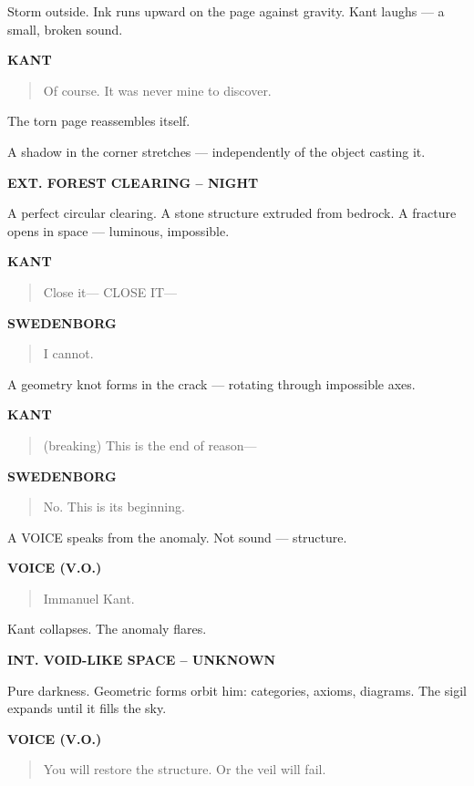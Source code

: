 \documentclass[12pt]{article}
\newcommand{\Scene}[1]{\vspace{1.2em}\textbf{#1}\vspace{0.8em}}
\newcommand{\Character}[1]{\vspace{0.8em}\textbf{#1}\vspace{0.4em}}
\newenvironment{Dialogue}{\begin{quote}\begin{RaggedRight}}{\end{RaggedRight}\end{quote}}
\newcommand{\Action}[1]{\vspace{0.4em}#1\vspace{0.4em}}
\begin{document}
\Action{Storm outside.  
Ink runs upward on the page against gravity.  
Kant laughs — a small, broken sound.}

\Character{KANT}
\begin{Dialogue}
Of course.  
It was never mine to discover.
\end{Dialogue}

\Action{The torn page reassembles itself.}

\Action{A shadow in the corner stretches — independently of the object casting it.}

\Scene{EXT. FOREST CLEARING – NIGHT}

\Action{A perfect circular clearing.  
A stone structure extruded from bedrock.  
A fracture opens in space — luminous, impossible.}

\Character{KANT}
\begin{Dialogue}
Close it— CLOSE IT—
\end{Dialogue}

\Character{SWEDENBORG}
\begin{Dialogue}
I cannot.
\end{Dialogue}

\Action{A geometry knot forms in the crack — rotating through impossible axes.}

\Character{KANT}
\begin{Dialogue}
(breaking)  
This is the end of reason—
\end{Dialogue}

\Character{SWEDENBORG}
\begin{Dialogue}
No.  
This is its beginning.
\end{Dialogue}

\Action{A VOICE speaks from the anomaly.  
Not sound — structure.}

\Character{VOICE (V.O.)}
\begin{Dialogue}
Immanuel Kant.
\end{Dialogue}

\Action{Kant collapses. The anomaly flares.}

\Scene{INT. VOID-LIKE SPACE – UNKNOWN}

\Action{Pure darkness.  
Geometric forms orbit him: categories, axioms, diagrams.  
The sigil expands until it fills the sky.}

\Character{VOICE (V.O.)}
\begin{Dialogue}
You will restore the structure.  
Or the veil will fail.
\end{Dialogue}
\end{document}
